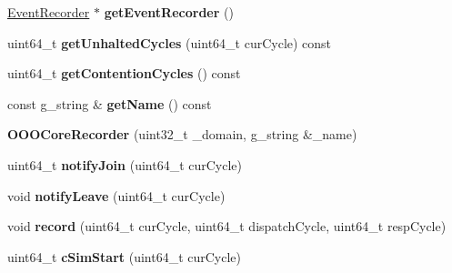 \begin{DoxyCompactItemize}
\item 
\hypertarget{classOOOCoreRecorder_ad3da06397db838c7a84706565bef39a0}{\hyperlink{classEventRecorder}{Event\-Recorder} $\ast$ {\bfseries get\-Event\-Recorder} ()}\label{classOOOCoreRecorder_ad3da06397db838c7a84706565bef39a0}

\item 
\hypertarget{classOOOCoreRecorder_a41f9c7df626593718d934bc34b020c47}{uint64\-\_\-t {\bfseries get\-Unhalted\-Cycles} (uint64\-\_\-t cur\-Cycle) const }\label{classOOOCoreRecorder_a41f9c7df626593718d934bc34b020c47}

\item 
\hypertarget{classOOOCoreRecorder_ad209b06e7cd2a6179f48d285467fee21}{uint64\-\_\-t {\bfseries get\-Contention\-Cycles} () const }\label{classOOOCoreRecorder_ad209b06e7cd2a6179f48d285467fee21}

\item 
\hypertarget{classOOOCoreRecorder_a63d175b3d61168f486a00f47b70a2d58}{const g\-\_\-string \& {\bfseries get\-Name} () const }\label{classOOOCoreRecorder_a63d175b3d61168f486a00f47b70a2d58}

\item 
\hypertarget{classOOOCoreRecorder_ad71f84f2693ed25658e5efcddf7e9341}{{\bfseries O\-O\-O\-Core\-Recorder} (uint32\-\_\-t \-\_\-domain, g\-\_\-string \&\-\_\-name)}\label{classOOOCoreRecorder_ad71f84f2693ed25658e5efcddf7e9341}

\item 
\hypertarget{classOOOCoreRecorder_a8038641e35855286f897a582c78e4f13}{uint64\-\_\-t {\bfseries notify\-Join} (uint64\-\_\-t cur\-Cycle)}\label{classOOOCoreRecorder_a8038641e35855286f897a582c78e4f13}

\item 
\hypertarget{classOOOCoreRecorder_a159c5560af33055f0004e9e6cb354c13}{void {\bfseries notify\-Leave} (uint64\-\_\-t cur\-Cycle)}\label{classOOOCoreRecorder_a159c5560af33055f0004e9e6cb354c13}

\item 
\hypertarget{classOOOCoreRecorder_ac2444a695ce658d7d09f0a4127f0734f}{void {\bfseries record} (uint64\-\_\-t cur\-Cycle, uint64\-\_\-t dispatch\-Cycle, uint64\-\_\-t resp\-Cycle)}\label{classOOOCoreRecorder_ac2444a695ce658d7d09f0a4127f0734f}

\item 
\hypertarget{classOOOCoreRecorder_aa41b17a7eb54f923bd40ee97a4017578}{uint64\-\_\-t {\bfseries c\-Sim\-Start} (uint64\-\_\-t cur\-Cycle)}\label{classOOOCoreRecorder_aa41b17a7eb54f923bd40ee97a4017578}


\end{DoxyCompactItemize}
